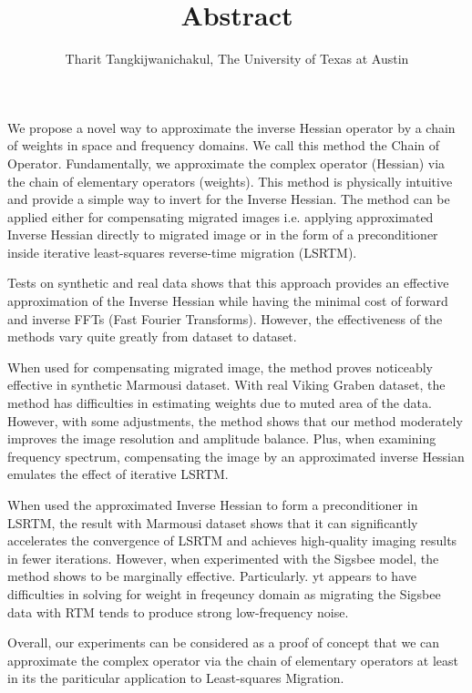 \author{Tharit Tangkijwanichakul, The University of Texas at Austin}
\title{Abstract}
\label{ch:abs}
We propose a novel way to approximate the inverse Hessian operator by a chain of weights in space and frequency domains. We call this method the Chain of Operator. Fundamentally, we approximate the complex operator (Hessian) via the chain of elementary operators (weights). This method is physically intuitive and provide a simple way to invert for the Inverse Hessian. The method can be applied either for compensating migrated images i.e. applying approximated Inverse Hessian directly to migrated image or in the form of a preconditioner inside iterative least-squares reverse-time migration (LSRTM). 

Tests on synthetic and real data shows that this approach provides an effective approximation of the Inverse Hessian while having the minimal cost of forward and inverse FFTs (Fast Fourier Transforms). However, the effectiveness of the methods vary quite greatly from dataset to dataset.

When used for compensating migrated image, the method proves noticeably effective in synthetic Marmousi dataset. With real Viking Graben dataset, the method has difficulties in estimating weights due to muted area of the data. However, with some adjustments, the method shows that our method moderately improves the image resolution and amplitude balance. Plus, when examining frequency spectrum, compensating the image by an approximated inverse Hessian emulates the effect of iterative LSRTM. 


When used the approximated Inverse Hessian to form a preconditioner in LSRTM, the result with Marmousi dataset shows that it can significantly accelerates the convergence of LSRTM and achieves high-quality imaging results in fewer iterations. However, when experimented with the Sigsbee model, the method shows to be marginally effective. Particularly. yt appears to have difficulties in solving for weight in freqeuncy domain as migrating the Sigsbee data with RTM tends to produce strong low-frequency noise.

Overall, our experiments can be considered as a proof of concept that we can approximate the complex operator via the chain of elementary operators at least in its the pariticular application to Least-squares Migration.